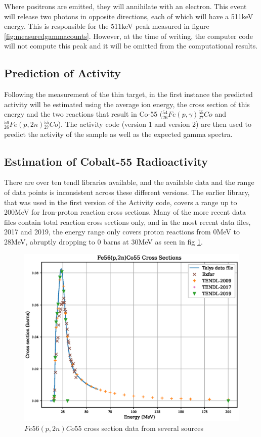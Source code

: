 Where positrons are emitted, they will annihilate with an electron.  This event will release two photons in opposite directions, each of which will have a 511keV energy.  This is responsible for the 511keV peak measured in figure \ref{fig:measuredgammacounts}.  However, at the time of writing, the computer code will not compute this peak and it will be omitted from the computational results.






\subsection{Prediction of Activity}

Following the measurement of the thin target, in the first instance the predicted activity will be estimated using the average ion energy, the cross section of this energy and the two reactions that result in Co-55 (${}^{54}_{26} Fe (p, \gamma) {}^{55}_{27} Co$ and ${}^{56}_{26} Fe (p, 2n) {}^{55}_{27} Co$).  The activity code (version 1 and version 2) are then used to predict the activity of the sample as well as the expected gamma spectra.




\FloatBarrier
\subsection{Estimation of Cobalt-55 Radioactivity}

There are over ten \acrshort{tendl} libraries available, and the available data and the range of data points is inconsistent across these different versions.  The earlier library, that was used in the first version of the Activity code, covers a range up to 200MeV for Iron-proton reaction cross sections.  Many of the more recent data files contain total reaction cross sections only, and in the most recent data files, 2017 and 2019, the energy range only covers proton reactions from 0MeV to 28MeV, abruptly dropping to 0 barns at 30MeV as seen in fig \ref{fig:fe56co55-cross-sections}.

\FloatBarrier
\begin{figure}[!htb]
\centering
\includegraphics[width=0.7\linewidth]{chapters/activity_code/fe56_co55/Fe56_Co55.eps}
\caption{$Fe56(p,2n)Co55$ cross section data from several sources \cite{tendl2009}\cite{tendl2017}\cite{tendl2019}\cite{exforco55}\cite{talys}}
\label{fig:fe56co55-cross-sections}
\end{figure}
\FloatBarrier


